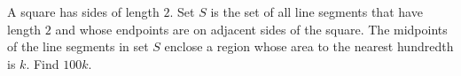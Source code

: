 A square has sides of length $2$. Set $S$ is the set of all line segments that have length $2$ and whose endpoints are on adjacent sides of the square. The midpoints of the line segments in set $S$ enclose a region whose area to the nearest hundredth is $k$. Find $100k$.